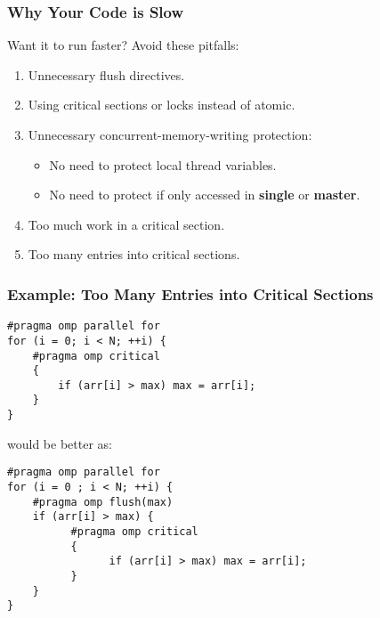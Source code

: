 \documentclass[aspectratio=43]{beamer}
\newenvironment{changemargin}[1]{%
  \begin{list}{}{%
    \setlength{\topsep}{0pt}%
    \setlength{\leftmargin}{#1}%
    \setlength{\rightmargin}{1em}
    \setlength{\listparindent}{\parindent}%
    \setlength{\itemindent}{\parindent}%
    \setlength{\parsep}{\parskip}%
  }%
  \item[]}{\end{list}}
\begin{document}
\begin{frame}
  \frametitle{Why Your Code is Slow}

  \begin{changemargin}{1.5cm}
  Want it to run faster? Avoid these pitfalls:
  \begin{enumerate}
    \item Unnecessary flush directives.
    \item Using critical sections or locks instead of atomic.
    \item Unnecessary concurrent-memory-writing protection:
      \begin{itemize}
        \item No need to protect local thread variables.
        \item No need to protect if only accessed in {\bf single} or
          {\bf master}.
      \end{itemize}
    \item Too much work in a critical section.
    \item Too many entries into critical sections.
  \end{enumerate}
  \end{changemargin}
\end{frame}

\begin{frame}[fragile]
  \frametitle{Example: Too Many Entries into Critical Sections}

  \begin{changemargin}{1.5cm}
  \begin{lstlisting}
#pragma omp parallel for
for (i = 0; i < N; ++i) { 
    #pragma omp critical
    {
        if (arr[i] > max) max = arr[i];
    } 
}
  \end{lstlisting}

would be better as:

  \begin{lstlisting}
#pragma omp parallel for
for (i = 0 ; i < N; ++i) { 
    #pragma omp flush(max)
    if (arr[i] > max) {
          #pragma omp critical
          {
                if (arr[i] > max) max = arr[i];
          }
    }
}
  \end{lstlisting}
  \end{changemargin}
\end{frame}
\end{document}
